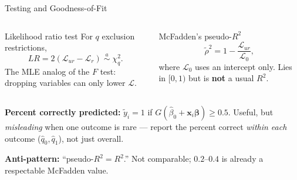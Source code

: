 \documentclass[aspectratio=169, 12pt]{beamer}
\newcommand{\xib}{\mathbf{x}_i\boldsymbol{\beta}}    %
\begin{document}
\begin{frame}[shrink=9]{Testing and Goodness-of-Fit}

  \begin{columns}[t]
    \begin{definitionbox}{Likelihood ratio test}
      For $q$ exclusion restrictions,
      \[
        LR = 2(\mathcal{L}_{ur} - \mathcal{L}_{r}) \;\overset{a}{\sim}\; \chi^2_q .
      \]
      The MLE analog of the $F$ test: dropping variables can only lower
      $\mathcal{L}$.
    \end{definitionbox}

    \begin{definitionbox}{McFadden's pseudo-$R^2$}
      \[
        \tilde\rho^2 = 1 - \frac{\mathcal{L}_{ur}}{\mathcal{L}_{0}},
      \]
      where $\mathcal{L}_0$ uses an intercept only. Lies in $[0,1)$ but is
      \textbf{not} a usual $R^2$.
    \end{definitionbox}
  \end{columns}

  \smallskip

  \begin{keybox}
    \textbf{Percent correctly predicted:} $\tilde y_i = 1$ if
    $G(\hat\beta_0 + \xib) \ge 0.5$. Useful, but \emph{misleading} when one
    outcome is rare --- report the percent correct \emph{within each} outcome
    ($\hat q_0,\hat q_1$), not just overall.

    \smallskip
    \textbf{Anti-pattern:} ``pseudo-$R^2 = R^2$.'' Not comparable; $0.2$--$0.4$ is
    already a respectable McFadden value.
  \end{keybox}

\end{frame}
\end{document}
